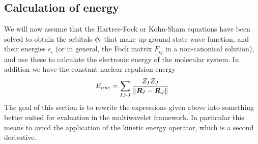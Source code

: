\subsection{Calculation of energy}
We will now assume that the Hartree-Fock or Kohn-Sham equations have been solved to obtain
the orbitals $\phi_i$ that make up ground state wave function, and their energies 
$\epsilon_i$ (or in general, the Fock matrix $F_{ij}$ in a non-canonical solution), and use
these to calculate the electronic energy of the molecular system. In addition we have the
constant nuclear repulsion energy
\begin{equation}
    E_{nuc} = \sum_{I>J} \frac{Z_IZ_J}{\|\boldsymbol R_I-\boldsymbol R_J\|}
\end{equation}
The goal of this section is to rewrite the expressions given above into something better 
suited for evaluation in the multiwavelet framework. In particular this means to avoid
the application of the kinetic energy operator, which is a second derivative.

